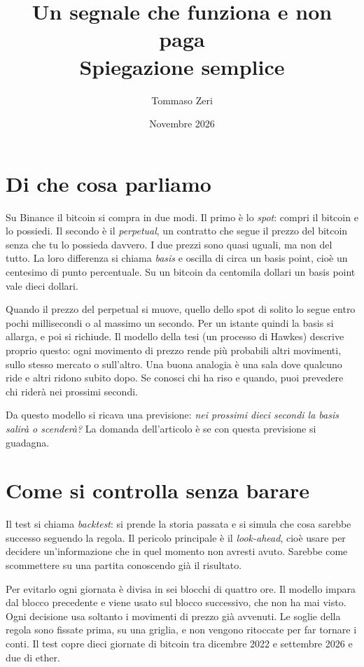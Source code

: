 \documentclass[a4paper,11pt]{article}
\title{Un segnale che funziona e non paga\\[2pt]
\large Spiegazione semplice}
\author{Tommaso Zeri}
\date{Novembre 2026}
\begin{document}
\maketitle

\section*{Di che cosa parliamo}

Su Binance il bitcoin si compra in due modi. Il primo è lo \emph{spot}: compri il bitcoin e lo possiedi. Il secondo è il \emph{perpetual}, un contratto che segue il prezzo del bitcoin senza che tu lo possieda davvero. I due prezzi sono quasi uguali, ma non del tutto. La loro differenza si chiama \emph{basis} e oscilla di circa un basis point, cioè un centesimo di punto percentuale. Su un bitcoin da centomila dollari un basis point vale dieci dollari.

Quando il prezzo del perpetual si muove, quello dello spot di solito lo segue entro pochi millisecondi o al massimo un secondo. Per un istante quindi la basis si allarga, e poi si richiude. Il modello della tesi (un processo di Hawkes) descrive proprio questo: ogni movimento di prezzo rende più probabili altri movimenti, sullo stesso mercato o sull'altro. Una buona analogia è una sala dove qualcuno ride e altri ridono subito dopo. Se conosci chi ha riso e quando, puoi prevedere chi riderà nei prossimi secondi.

Da questo modello si ricava una previsione: \emph{nei prossimi dieci secondi la basis salirà o scenderà?} La domanda dell'articolo è se con questa previsione si guadagna.

\section*{Come si controlla senza barare}

Il test si chiama \emph{backtest}: si prende la storia passata e si simula che cosa sarebbe successo seguendo la regola. Il pericolo principale è il \emph{look-ahead}, cioè usare per decidere un'informazione che in quel momento non avresti avuto. Sarebbe come scommettere su una partita conoscendo già il risultato.

Per evitarlo ogni giornata è divisa in sei blocchi di quattro ore. Il modello impara dal blocco precedente e viene usato sul blocco successivo, che non ha mai visto. Ogni decisione usa soltanto i movimenti di prezzo già avvenuti. Le soglie della regola sono fissate prima, su una griglia, e non vengono ritoccate per far tornare i conti. Il test copre dieci giornate di bitcoin tra dicembre 2022 e settembre 2026 e due di ether.
\end{document}
